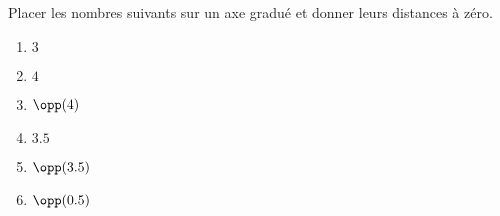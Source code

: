 
\begin{exercice}\label{exo2smath-0045}

    Placer les nombres suivants sur un axe gradué et donner leurs distances à zéro.
    \begin{multicols}{3}
        \begin{enumerate}
            \item
                \( 3\)
            \item
                \( 4\)
            \item
                \( \opp(4)\)
            \item
                \( 3.5\)
            \item
                \( \opp(3.5)\)
            \item
                \( \opp(0.5)\)
        \end{enumerate}
    \end{multicols}

\end{exercice}

